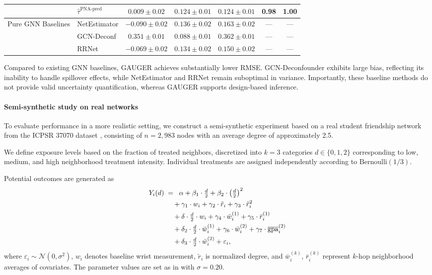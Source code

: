 \documentclass[twoside,letterpaper]{article}
\theoremstyle{plain}
\theoremstyle{definition}
\theoremstyle{remark}
\begin{document}
\begin{table}[htbp]
\begin{tabular}{ll|ccc|cc}
& $\hat{\tau}^{\text{PNA-pred}}$ 
& $\mathbf{0.009 \pm 0.02}$ & $\mathbf{0.124 \pm 0.01}$ & $\mathbf{0.124 \pm 0.01}$ & 0.98 & 1.00 \\
\midrule
\multirow{3}{*}{Pure GNN Baselines}
& NetEstimator 
& $-0.090 \pm 0.02$ & $0.136 \pm 0.02$ & $0.163 \pm 0.02$ & --- & --- \\
& GCN-Deconf 
& $0.351 \pm 0.01$ & $0.088 \pm 0.01$ & $0.362 \pm 0.01$ & --- & --- \\
& RRNet 
& $-0.069 \pm 0.02$ & $0.134 \pm 0.02$ & $0.150 \pm 0.02$ & --- & --- \\
\bottomrule
\end{tabular}
\label{tab:synthetic_full}
\end{table}
Compared to existing GNN baselines, GAUGER achieves substantially lower RMSE. GCN-Deconfounder exhibits large bias, reflecting its inability to handle spillover effects, while NetEstimator and RRNet remain suboptimal in variance. Importantly, these baseline methods do not provide valid uncertainty quantification, whereas GAUGER supports design-based inference.


\paragraph{Semi-synthetic study on real networks}

To evaluate performance in a more realistic setting, we construct a semi-synthetic experiment based on a real student friendship network from the ICPSR 37070 dataset \citep{aronow2017estimating}, consisting of $n = 2{,}983$ nodes with an average degree of approximately 2.5. 

We define exposure levels based on the fraction of treated neighbors, discretized into $k = 3$ categories $d \in \{0,1,2\}$ corresponding to low, medium, and high neighborhood treatment intensity. Individual treatments are assigned independently according to $\mathrm{Bernoulli}(1/3)$.

Potential outcomes are generated as
\begin{align}
  Y_i(d) \;&=\;
    \;\alpha
     + \beta_1 \cdot \tfrac{d}{2}
     + \beta_2 \cdot \bigl(\tfrac{d}{2}\bigr)^2 \notag \\
    &\quad + \gamma_1 \cdot w_i
     + \gamma_2 \cdot \tilde{r}_i
     + \gamma_3 \cdot \tilde{r}_i^2 \notag \\
    &\quad + \delta \cdot \tfrac{d}{2} \cdot w_i + \gamma_4 \cdot \bar{w}_i^{(1)}
     + \gamma_5 \cdot \bar{r}_i^{(1)} \notag \\
    &\quad + \delta_2 \cdot \tfrac{d}{2} \cdot \bar{w}_i^{(1)} + \gamma_6 \cdot \bar{w}_i^{(2)}
     + \gamma_7 \cdot \overline{\mathrm{gpa}}_i^{(2)} \notag \\
    &\quad + \delta_3 \cdot \tfrac{d}{2} \cdot \bar{w}_i^{(2)}
     + \varepsilon_i,
\end{align}
where $\varepsilon_i \sim \mathcal{N}(0, \sigma^2)$, $w_i$ denotes baseline wrist measurement, $\tilde{r}_i$ is normalized degree, and $\bar{w}_i^{(k)}$, $\bar{r}_i^{(k)}$ represent $k$-hop neighborhood averages of covariates. The parameter values are set as in with $\sigma = 0.20$.
\end{document}
